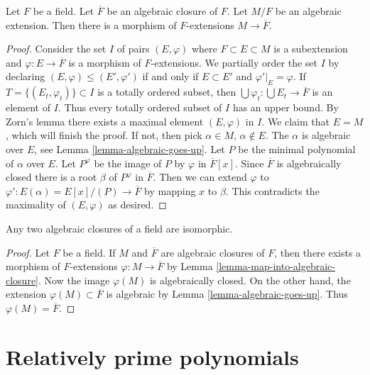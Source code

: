 \begin{lemma}
\label{lemma-map-into-algebraic-closure}
Let $F$ be a field. Let $\overline{F}$ be an algebraic closure of $F$.
Let $M/F$ be an algebraic extension. Then there is a morphism of
$F$-extensions $M \to \overline{F}$.
\end{lemma}

\begin{proof}
Consider the set $I$ of pairs $(E, \varphi)$ where $F \subset E \subset M$
is a subextension and $\varphi : E \to \overline{F}$ is a morphism of
$F$-extensions. We partially order the set $I$ by declaring
$(E, \varphi) \leq (E', \varphi')$ if and only if $E \subset E'$ and
$\varphi'|_E = \varphi$. If $T = \{(E_t,  \varphi_t)\} \subset I$
is a totally ordered subset, then
$\bigcup \varphi_t : \bigcup E_t \to \overline{F}$ is an element of $I$.
Thus every totally ordered subset of $I$ has an upper bound.
By Zorn's lemma there exists a maximal element $(E, \varphi)$ in $I$.
We claim that $E = M$, which will finish the proof. If not, then
pick $\alpha \in M$, $\alpha \not \in E$. The $\alpha$ is algebraic
over $E$, see Lemma \ref{lemma-algebraic-goes-up}.
Let $P$ be the minimal polynomial of $\alpha$ over $E$.
Let $P^\varphi$ be the image of $P$ by $\varphi$ in $\overline{F}[x]$.
Since $\overline{F}$ is algebraically closed there is a root $\beta$
of $P^\varphi$ in $\overline{F}$. Then we can extend $\varphi$ to
$\varphi' : E(\alpha) = E[x]/(P) \to \overline{F}$ by mapping
$x$ to $\beta$. This contradicts the maximality of $(E, \varphi)$
as desired.
\end{proof}

\begin{lemma}
\label{lemma-algebraic-closures-isomorphic}
Any two algebraic closures of a field are isomorphic.
\end{lemma}

\begin{proof}
Let $F$ be a field. If $M$ and $\overline{F}$ are algebraic closures of
$F$, then there exists a morphism of $F$-extensions
$\varphi : M \to \overline{F}$ by
Lemma \ref{lemma-map-into-algebraic-closure}.
Now the image $\varphi(M)$ is algebraically closed.
On the other hand, the extension $\varphi(M) \subset \overline{F}$
is algebraic by Lemma \ref{lemma-algebraic-goes-up}.
Thus $\varphi(M) = \overline{F}$.
\end{proof}





\section{Relatively prime polynomials}
\label{section-relatively-prime}

